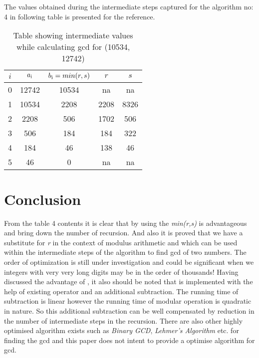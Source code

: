 \documentclass[conference,compsoc]{IEEEtran}
\newcommand{\var}[1]{\textit{#1}}
\renewcommand{\mod}{\text{mod}}
\newcommand{\moddashdash}{\text{mod''}}
\begin{document}
The values obtained during the intermediate steps captured for the algorithm no: 4 in following table is presented for the reference.
\begin{table}[!htbp]
\caption{Table showing intermediate values while calculating gcd for (10534, 12742)}
\label{table:4}
\centering
	\begin{tabular}{c | c | c | c| c}
	\hline
	$i$ & $a\textsubscript{i}$ & $b\textsubscript{i} = min(r,s)$ & $r$ & $s$\\ [0.5ex] 
	\hline
		0 & 12742 & 10534 & na   & na \\ 
		1 & 10534 & 2208  & 2208 & 8326\\  
		2 & 2208  & 506   & 1702 & 506\\
		3 & 506   & 184   & 184  & 322\\
		4 & 184   & 46    & 138  & 46\\
		5 & 46    & 0     & na   & na
	\end{tabular}
\end{table}

\section{Conclusion}
From the table 4 contents it is clear that by using the \var{min(r,s)} is advantageous and bring down the number of recursion. And also it is proved that we have a substitute for \var{r} in the context of modulus arithmetic and which can be used within the intermediate steps of the algorithm to find gcd of two numbers. The order of optimization is still under investigation and could be significant when we integers with very very long digits may be in the order of thousands! Having discussed the advantage of \moddashdash, it also should be noted that \moddashdash is implemented with the help of existing \mod operator and an additional subtraction. The running time of subtraction is linear however the running time of modular operation is quadratic in nature. So this additional subtraction can be well compensated by reduction in the number of intermediate steps in the recursion. There are also other highly optimised algorithm exists such as \var{Binary GCD}, \var{Lehmer's Algorithm} etc. for finding the gcd and this paper does not intent to provide a optimise algorithm for gcd.
\end{document}
